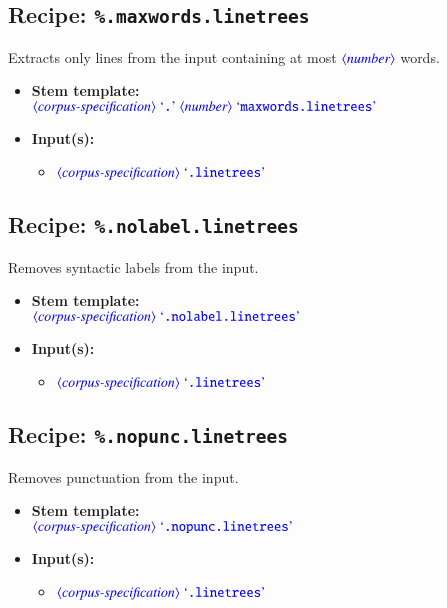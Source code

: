 \documentclass[12pt]{report}
\def\blue{\color{blue}}
\begin{document}
\subsection{Recipe: {\blue\tt \%.maxwords.linetrees}}

Extracts only lines from the input containing at most $\dtype{number}$ words.

\begin{itemize}
      \item \textbf{Stem template:}\\
      $\dtype{corpus-specification} \ \dcode{.} \ \dtype{number} \ \dcode{maxwords.linetrees}$
      \item \textbf{Input(s):}
      \begin{itemize}
            \item $\dtype{corpus-specification} \ \dcode{.linetrees}$
      \end{itemize}
\end{itemize}

\subsection{Recipe: {\blue\tt \%.nolabel.linetrees}}

Removes syntactic labels from the input.

\begin{itemize}
      \item \textbf{Stem template:}\\
      $\dtype{corpus-specification} \ \dcode{.nolabel.linetrees}$
      \item \textbf{Input(s):}
      \begin{itemize}
            \item $\dtype{corpus-specification} \ \dcode{.linetrees}$
      \end{itemize}
\end{itemize}

\subsection{Recipe: {\blue\tt \%.nopunc.linetrees}}

Removes punctuation from the input.

\begin{itemize}
      \item \textbf{Stem template:}\\
      $\dtype{corpus-specification} \ \dcode{.nopunc.linetrees}$
      \item \textbf{Input(s):}
      \begin{itemize}
            \item $\dtype{corpus-specification} \ \dcode{.linetrees}$
      \end{itemize}
\end{itemize}
\end{document}
